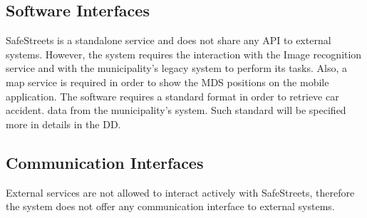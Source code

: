 \subsection{Software Interfaces}
SafeStreets is a standalone service and does not share any API to 
external systems. However, the system requires the interaction with the Image recognition service and with the municipality's legacy system to perform its tasks. Also, a map service is required in order to show the MDS positions on the mobile application.\newline
The software requires a standard format in order to retrieve car accident.
data from the municipality's system. Such standard will be specified more in details in the DD.
\subsection{Communication Interfaces}
External services are not allowed to interact actively with SafeStreets, therefore the system does not offer any communication interface to external systems.
